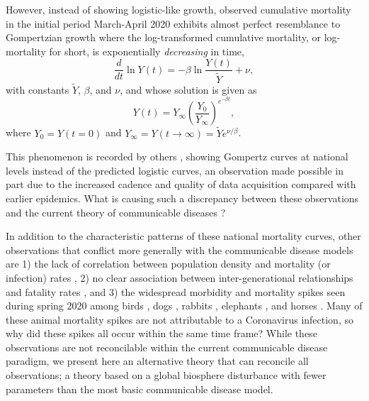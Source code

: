 \documentclass{article}
\newcommand{\insertSmallPdfFig}[3]{
  \begin{figure}[h]
  \centering
  \texttt{[image: \#1.pdf]}
  \caption{#2}
  \label{fig:#1}
  \end{figure}
}
\begin{document}
However, instead of showing logistic-like growth, observed cumulative mortality in the initial period March-April 2020 exhibits almost perfect resemblance to Gompertzian growth \cite{Gompertz1825,bajzer1997mathematical} where the log-transformed cumulative mortality, or log-mortality for short, is exponentially \emph{decreasing} in time,
\begin{equation}
\label{eq:GompertzODE}
\frac{d}{dt}\ln{Y(t)} = -\beta\ln{\frac{Y(t)}{\tilde{Y}}} + \nu,
\end{equation} 
with constants $\tilde{Y}$, $\beta$, and $\nu$, and whose solution is given as
\begin{equation}
\label{eq:gomp_solution}
Y(t) = Y_\infty \left(\frac{Y_0}{Y_\infty}\right)^{e^{-\beta t}},
\end{equation}
where $Y_{0}=Y(t = 0)$ and $Y_{\infty}=Y(t\rightarrow \infty)=\tilde{Y}e^{\nu/\beta}$.


This phenomenon is recorded by others \cite{Ohnishi2020,Rypdal2020,Catala2020,rodrigues2020monte,Levitt2020}, showing Gompertz curves at national levels instead of the predicted logistic curves, an observation made possible in part due to the increased cadence and quality of data acquisition compared with earlier epidemics. What is causing such a discrepancy between these observations and the current theory of communicable diseases \cite{castro2020turning}? 

In addition to the characteristic patterns of these national mortality curves, other observations that conflict more generally with the communicable disease models are 1) the lack of correlation between population density and mortality (or infection) rates \cite{Hamidi2020,Hamidi2020a,Carozzi2020,liu2020emerging,medica2020covid,khavarian2021high,barak2021urban}, 2) no clear association between inter-generational relationships and fatality rates \cite{Arpino2020}, and 3) the widespread morbidity and mortality spikes seen during spring 2020 among birds \cite{Fischer2021}, dogs \cite{PeriseBarrios2021}, rabbits \cite{Duff2020,Hu2020,Fukui2021}, elephants \cite{Aarde2021}, and horses \cite{Kambayashi2021,King2020,Lu2020,CastilloOlivares2020}. Many of these animal mortality spikes are not attributable to a Coronavirus infection, so why did these spikes all occur within the same time frame? While these observations are not reconcilable within the current communicable disease paradigm, we present here an alternative theory that can reconcile all observations; a theory based on a global biosphere disturbance with fewer parameters than the most basic communicable disease model. 
\end{document}
